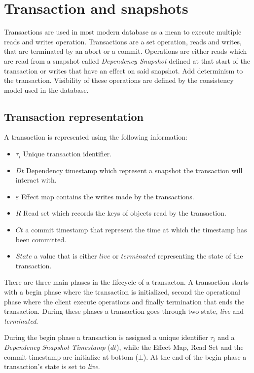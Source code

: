 \documentclass[systeme]{compas2022}
\begin{document}
\section{Transaction and snapshots}


Transactions are used in most modern database as a mean to execute multiple reads and writes operation.
Transactions are a set operation, reads and writes, that are terminated by an abort or a commit.
Operations are either reads which are read from a snapshot called \emph{Dependency Snapshot} defined at that start of the transaction or writes that have an effect on said snapshot. Add determinism to the transaction.
Visibility of these operations are defined by the consistency model used in the database.


\subsection{Transaction representation}

A transaction is represented using the following information:
\begin{itemize}
\item $\tau_i$ Unique transaction identifier.
\item $Dt$ Dependency timestamp which represent a snapshot the transaction will interact with.
\item $\varepsilon$ Effect map contains the writes made by the transactions.
\item $R$ Read set which records the keys of objects read by the transaction.
\item $Ct$ a commit timestamp that represent the time at which the timestamp has been committed.
\item $State$ a value that is either $live$ or $terminated$ representing the state of the transaction.\\
\end{itemize}

There are three main phases in the lifecycle of a transacton.
A transaction starts with a begin phase where the transaction is initialized, second the operational phase where the client execute operations and finally termination that ends the transaction.
During these phases a transaction goes through two state, \emph{live} and \emph{terminated}.

During the begin phase a transaction is assigned a unique identifier $\tau_i$ and a \emph{Dependency Snapshot Timestamp} ($dt$), while the Effect Map, Read Set and the commit timestamp are initialize at bottom ($\bot$).
At the end of the begin phase a transaction's state is set to \emph{live}.
\end{document}
